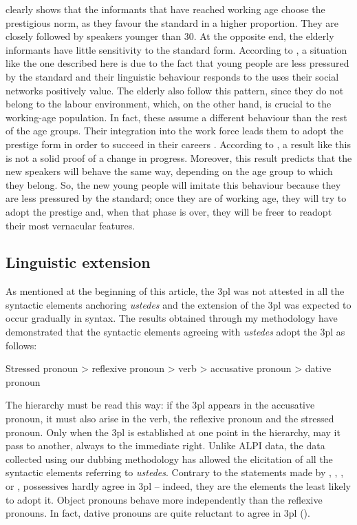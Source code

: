 \documentclass[output=paper]{LSP/langsci}
\begin{document}
 clearly shows that the informants that have reached working age choose the prestigious norm, as they favour the standard in a higher proportion. They are closely followed by speakers younger than 30. At the opposite end, the elderly informants have little sensitivity to the standard form. According to \citet{chambers_dialectology_1980}, a situation like the one described here is due to the fact that young people are less pressured by the standard and their linguistic behaviour responds to the uses their social networks positively value. The elderly also follow this pattern, since they do not belong to the labour environment, which, on the other hand, is crucial to the working-age population. In fact, these assume a different behaviour than the rest of the age groups. Their integration into the work force leads them to adopt the prestige form in order to succeed in their careers \citep{macaulay_language_1977,bourdieu_mercado_1978,seara_variacao_2000}. According to \citet{chambers_dialectology_1980}, a result like this is not a solid proof of a change in progress. Moreover, this result predicts that the new speakers will behave the same way, depending on the age group to which they belong. So, the new young people will imitate this behaviour because they are less pressured by the standard; once they are of working age, they will try to adopt the prestige and, when that phase is over, they will be freer to readopt their most vernacular features.

\subsection{Linguistic extension}
As mentioned at the beginning of this article, the 3pl was not attested in all the syntactic elements anchoring \textit{ustedes} and the extension of the 3pl was expected to occur gradually in syntax. The results obtained through my methodology have demonstrated that the syntactic elements agreeing with \textit{ustedes} adopt the 3pl as follows:

\begin{exe}
\ex Stressed pronoun {\textgreater} reflexive pronoun {\textgreater} verb {\textgreater} accusative pronoun {\textgreater} dative pronoun 
\end{exe}

\largerpage[-1]
The hierarchy must be read this way: if the 3pl appears in the accusative pronoun, it must also arise in the verb, the reflexive pronoun and the stressed pronoun. Only when the 3pl is established at one point in the hierarchy, may it pass to another, always to the immediate right. Unlike ALPI data, the data collected using our dubbing methodology has allowed the elicitation of all the syntactic elements referring to \textit{ustedes}. Contrary to the statements made by \citet{mondejar_verbo_1974}, \citet{lapesa_estudios_2000}, \citet{cano_historia_2004}, \citet{penny_variacion_2004} or \citet{menendez_pidal_historia_2005}, possessives hardly agree in 3pl – indeed, they are the elements the least likely to adopt it. Object pronouns behave more independently than the reflexive pronouns. In fact, dative pronouns are quite reluctant to agree in 3pl ().  
\end{document}
